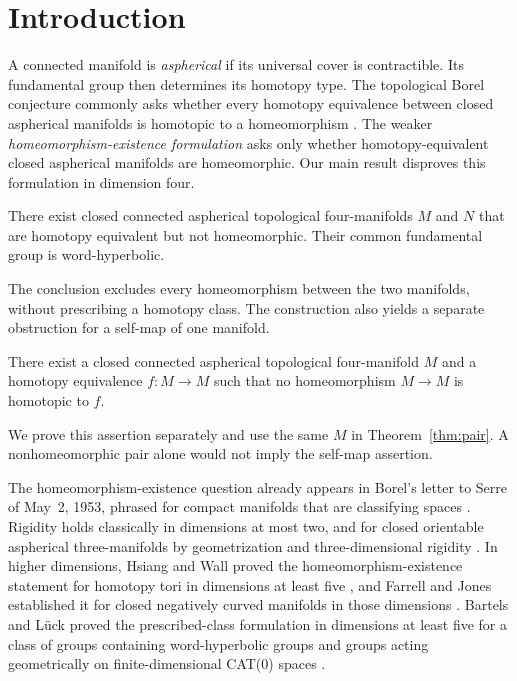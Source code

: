 \section{Introduction}\label{sec:introduction}

A connected manifold is \emph{aspherical} if its universal cover is
contractible.  Its fundamental group then determines its homotopy type.
The topological Borel conjecture commonly asks whether every homotopy
equivalence between closed aspherical manifolds is homotopic to a
homeomorphism \cite{BartelsLueck2012,Lueck2010}.  The weaker
\emph{homeomorphism-existence formulation} asks only whether
homotopy-equivalent closed aspherical manifolds are homeomorphic.
Our main result disproves this formulation in dimension four.

\begin{theorem}\label{thm:pair}
There exist closed connected aspherical topological four-manifolds
$M$ and $N$ that are homotopy equivalent but not homeomorphic.
Their common fundamental group is word-hyperbolic.
\end{theorem}

The conclusion excludes every homeomorphism between the two manifolds,
without prescribing a homotopy class.  The construction also yields a
separate obstruction for a self-map of one manifold.

\begin{theorem}\label{thm:self-map}
There exist a closed connected aspherical topological four-manifold
$M$ and a homotopy equivalence $f\colon M\to M$ such that no
homeomorphism $M\to M$ is homotopic to $f$.
\end{theorem}

We prove this assertion separately and use the same $M$ in
Theorem~\ref{thm:pair}.  A nonhomeomorphic pair alone would not imply
the self-map assertion.

The homeomorphism-existence question already appears in Borel's letter
to Serre of May~2, 1953, phrased for compact manifolds that are
classifying spaces \cite{Borel1953}.  Rigidity holds classically in
dimensions at most two, and for closed orientable aspherical
three-manifolds by geometrization and three-dimensional rigidity
\cite[Theorem~0.7 and Section~5]{KreckLueck2009}.
In higher dimensions, Hsiang and Wall proved the homeomorphism-existence
statement for homotopy tori in dimensions at least five
\cite{HsiangWall1969}, and Farrell and Jones established it for closed
negatively curved manifolds in those dimensions
\cite{FarrellJones1989}.  Bartels and L\"uck proved the prescribed-class
formulation in dimensions at least five for a class of groups containing
word-hyperbolic groups and groups acting geometrically on
finite-dimensional CAT(0) spaces \cite[Theorem~A]{BartelsLueck2012}.

